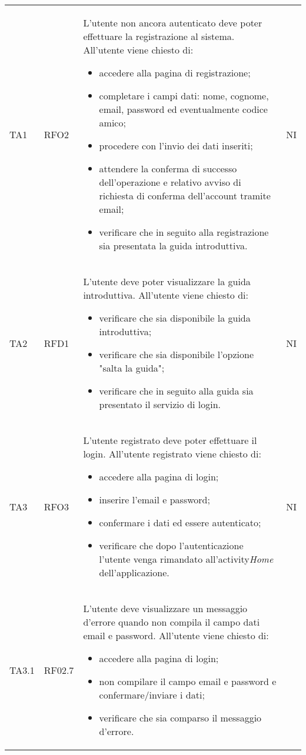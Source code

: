 \begin{longtable}{ >{\centering}p{} >{\centering}p{} >{\centering}p{}
			>{\centering}p{}}
		TA1	& RFO2 &	L'utente non ancora autenticato deve poter effettuare la registrazione al sistema. All'utente viene chiesto di:
		\begin{itemize}
			\item accedere alla pagina di registrazione;
			\item completare i campi dati: nome, cognome, email, password ed eventualmente codice amico;
			\item procedere con l'invio dei dati inseriti;
			\item attendere la conferma di successo dell'operazione e relativo avviso di richiesta di conferma dell'account tramite email;
			\item verificare che in seguito alla registrazione sia presentata la guida introduttiva.
		\end{itemize}	&	NI	\tabularnewline
		TA2	& RFD1 &	L'utente deve poter visualizzare la guida introduttiva. All'utente viene chiesto di:
		 \begin{itemize}
		 	\item verificare che sia disponibile la guida introduttiva;
		 	\item verificare che sia disponibile l'opzione "salta la guida";
		 	\item verificare che in seguito alla guida sia presentato il servizio di login. 
		 \end{itemize}	&	NI	\tabularnewline
		 TA3	& RFO3 & L'utente registrato deve poter effettuare il login. All'utente registrato viene chiesto di:
		 \begin{itemize}
		 	\item accedere alla pagina di login;
		 	\item inserire l'email e password;
		 	\item confermare i dati ed essere autenticato;
		 	\item verificare che dopo l'autenticazione l'utente venga rimandato all'activity\glosp \textit{Home} dell'applicazione.
		 \end{itemize}	&	NI	\tabularnewline
		 TA3.1 & RF02.7	& L'utente deve visualizzare un messaggio d'errore quando non compila il campo dati email e password. All'utente viene chiesto di:
		 \begin{itemize}
		 	\item accedere alla pagina di login;
		 	\item non compilare il campo email e password e confermare/inviare i dati;
		 	\item verificare che sia comparso il messaggio d'errore.

\end{itemize}
\end{longtable}
